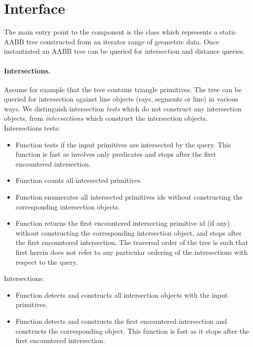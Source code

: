 \section{Interface}
\label{AABB_tree_section_interface}

The main entry point to the component is the class  which represents a static AABB tree constructed from an iterator range of geometric data. Once instantiated an AABB tree can be queried for intersection and distance queries.\\

\paragraph{Intersections.} Assume for example that the tree contains triangle primitives. The tree can be queried for intersection against line objects (rays, segments or line) in various ways. We distinguish intersection \emph{tests} which do not construct any intersection objects, from \emph{intersections} which construct the intersection objects.\\

Intersections tests:
\begin{itemize}
\item Function  tests if the input primitives are intersected by the query. This function is fast as involves only predicates and stops after the first encountered intersection.
\item Function  counts all intersected primitives.
\item Function  enumerates all intersected primitives ids without constructing the corresponding intersection objects.
\item Function  returns the first encountered intersecting primitive id (if any) without constructing the corresponding intersection object, and stops after the first encountered intersection. The traversal order of the tree is such that first herein does not refer to any particular ordering of the intersections with respect to the query.
\end{itemize}

Intersections:
\begin{itemize}
\item Function  detects and constructs all intersection objects with the input primitives.
\item Function  detects and constructs the first encountered intersection and constructs the corresponding object. This function is fast as it stops after the first encountered intersection.
\end{itemize}

